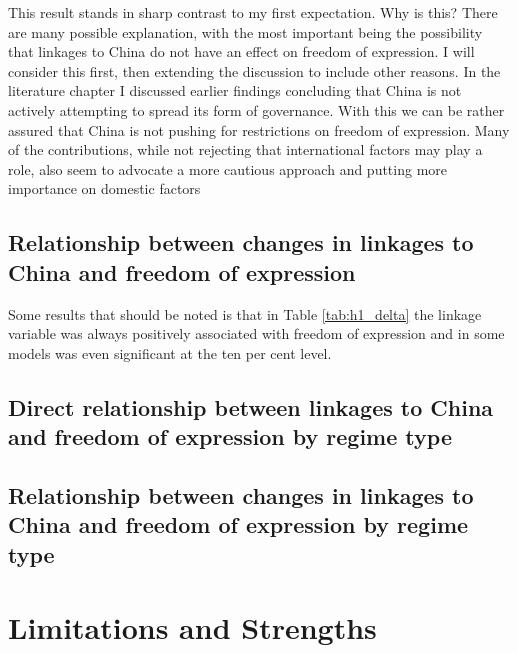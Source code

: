 This result stands in sharp contrast to my first expectation. Why is this? There are many possible explanation, with the most important being the possibility that linkages to China do not have an effect on freedom of expression. I will consider this first, then extending the discussion to include other reasons. In the literature chapter I discussed earlier findings concluding that China is not actively attempting to spread its form of governance. With this we can be rather assured that China is not pushing for restrictions on freedom of expression. Many of the contributions, while not rejecting that international factors may play a role, also seem to advocate a more cautious approach and putting more importance on domestic factors \citep{bader_china_2015, }

\subsection{Relationship between changes in linkages to China and freedom of expression}

Some results that should be noted is that in Table \ref{tab:h1_delta} the linkage variable was always positively associated with freedom of expression and in some models was even significant at the ten per cent level. 

\subsection{Direct relationship between linkages to China and freedom of expression by regime type}

\subsection{Relationship between changes in linkages to China and freedom of expression by regime type}

\section{Limitations and Strengths}